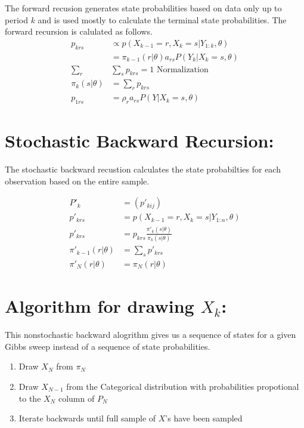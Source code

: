 \documentclass[12pt]{article}
\begin{document}
The forward recusion generates state probabilities based on data only 
up to period $k$ and is used mostly to calculate the terminal state probabilities. 
The forward recursion is calulated as follows. 
\begin{align*}
  p_{krs} &\propto p(X_{k-1}=r, X_{k}=s | Y_{1:k}, \theta) \\
  &= \pi_{k-1}(r|\theta)a_{rs}P(Y_k|X_k = s, \theta)\\
  \sum_{r} &\sum_{s} p_{krs} = 1 \text{ Normalization }\\
  \pi_{k}(s|\theta) &= \sum_r p_{krs}\\
  p_{1rs} &= \rho_r a_{rs} P(Y|X_k = s, \theta) 
\end{align*}

\section*{Stochastic Backward Recursion:}
The stochastic backward recustion calculates the state probabilties 
for each observation based on the entire sample. 

\begin{align*}
  P'_k &= (p'_{kij}) \\
  p'_{krs} &= p(X_{k-1}=r, X_{k}=s | Y_{1:n}, \theta) \\
  p'_{krs} &= p_{krs}\frac{\pi'_k(s | \theta)}{\pi_k(s|\theta)}\\
  \pi'_{k-1}(r|\theta) &= \sum_s p'_{krs}\\
  \pi'_{N}(r|\theta) &= \pi_{N}(r | \theta)
\end{align*}

\section*{Algorithm for drawing $X_k$:}
This nonstochastic backward alogrithm gives us a sequence of states for a given Gibbs 
sweep instead of a sequence of state probabilities. 

\begin{enumerate}
  \item Draw $X_N$ from $\pi_{N}$
  \item Draw $X_{N-1}$ from the Categorical distribution with probabilities
    propotional to the $X_{N}$ column of $P_N$
  \item Iterate backwards until full sample of $X$'s have been sampled
\end{enumerate}

\newpage
\end{document}
